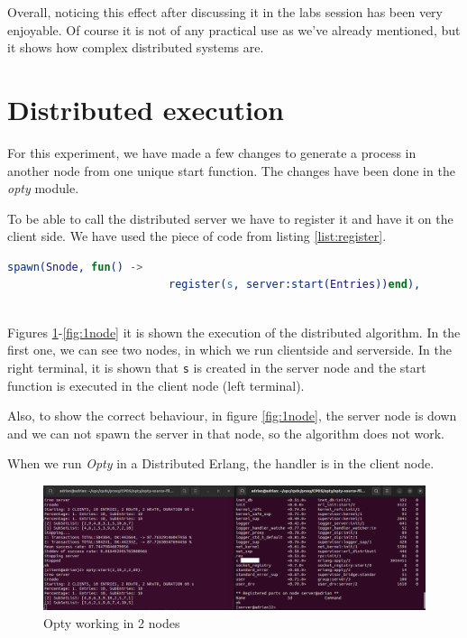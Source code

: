 \documentclass[a4paper, 10pt]{article}
\begin{document}
Overall, noticing this effect after discussing it in the labs session has been very enjoyable. Of course it is not of any practical use as we've already mentioned, but it shows how complex distributed systems are.

\clearpage
\section{Distributed execution}

For this experiment, we have made a few changes to generate a process in another node from one unique start function. The changes have been done in the \textit{opty} module. 

To be able to call the distributed server we have to register it and have it on the client side. We have used the piece of code from listing \ref{list:register}.


\begin{minipage}{\textwidth}
  \begin{lstlisting}[language=erlang, caption={Register Distributed Server}, label={list:register}]
    spawn(Snode, fun() -> 
                         register(s, server:start(Entries))end),
  
 	\end{lstlisting}
\end{minipage}

Figures \ref{fig:2nodes}-\ref{fig:1node} it is shown the execution of the distributed algorithm. In the first one, we can see two nodes, in which we run clientside and serverside. In the right terminal, it is shown that \texttt{s} is created in the server node and the start function is executed in the client node (left terminal). 

Also, to show the correct behaviour, in figure \ref{fig:1node}, the server node is down and we can not spawn the server in that node, so the algorithm does not work.


When we run \textit{Opty} in a Distributed Erlang, the handler is in the client node.



\begin{figure}[H]
  \centering
  \includegraphics[width=0.95\linewidth]{images/optyWorking.png}
    \caption{Opty working in 2 nodes}
    \label{fig:2nodes}
\end{figure} 
\end{document}
